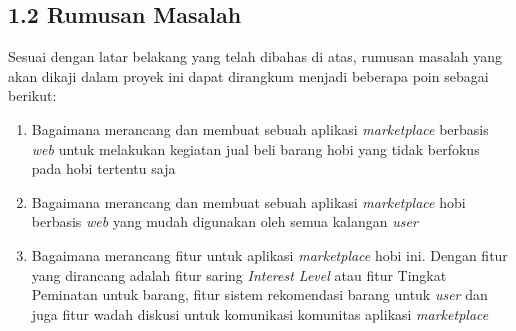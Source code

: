 \documentclass[a4paper]{article}
\begin{document}
\subsection*{1.2 Rumusan Masalah}

Sesuai dengan latar belakang yang telah dibahas di atas, rumusan masalah yang akan dikaji dalam proyek ini dapat dirangkum menjadi beberapa poin sebagai berikut:
\begin{enumerate}
    \item Bagaimana merancang dan membuat sebuah aplikasi \textit{marketplace} berbasis \textit{web} untuk melakukan kegiatan jual beli barang hobi yang tidak berfokus pada hobi tertentu saja
    \item Bagaimana merancang dan membuat sebuah aplikasi \textit{marketplace} hobi berbasis \textit{web} yang mudah digunakan oleh semua kalangan \textit{user}
    \item Bagaimana merancang fitur untuk aplikasi \textit{marketplace} hobi ini. Dengan fitur yang dirancang adalah fitur saring \textit{Interest Level} atau fitur Tingkat Peminatan untuk barang, fitur sistem rekomendasi barang untuk \textit{user} dan juga fitur wadah diskusi untuk komunikasi komunitas aplikasi \textit{marketplace}
\end{enumerate}
\end{document}
